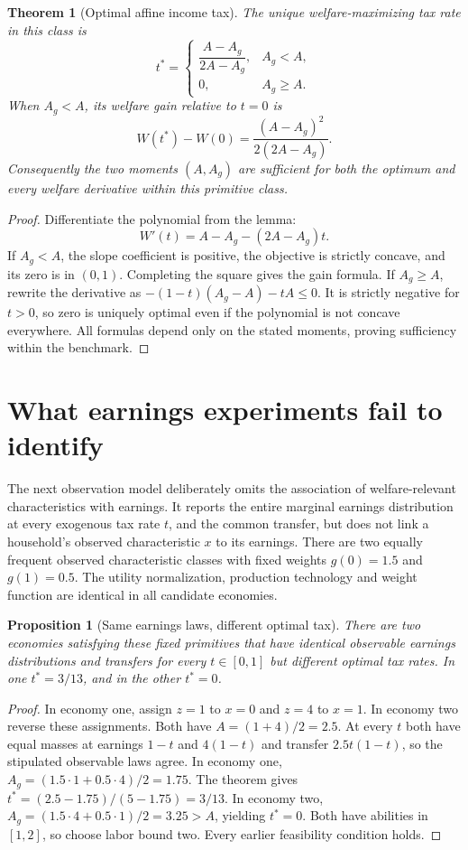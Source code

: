 \documentclass[11pt]{article}
\newtheorem{theorem}{Theorem}
\newtheorem{proposition}{Proposition}
\theoremstyle{definition}
\begin{document}
\begin{theorem}[Optimal affine income tax]
The unique welfare-maximizing tax rate in this class is
\[
 t^*=\begin{cases}
 \dfrac{A-A_g}{2A-A_g},& A_g<A,\\[6pt]
 0,& A_g\geq A.
 \end{cases}
\]
When $A_g<A$, its welfare gain relative to $t=0$ is
\[
 W(t^*)-W(0)=\frac{(A-A_g)^2}{2(2A-A_g)}.
\]
Consequently the two moments $(A,A_g)$ are sufficient for both the optimum and every welfare derivative within this primitive class.
\end{theorem}
\begin{proof}
Differentiate the polynomial from the lemma:
\[
 W'(t)=A-A_g-(2A-A_g)t.
\]
If $A_g<A$, the slope coefficient is positive, the objective is strictly concave, and its zero is in $(0,1)$. Completing the square gives the gain formula. If $A_g\geq A$, rewrite the derivative as $-(1-t)(A_g-A)-tA\leq0$. It is strictly negative for $t>0$, so zero is uniquely optimal even if the polynomial is not concave everywhere. All formulas depend only on the stated moments, proving sufficiency within the benchmark.
\end{proof}

\section*{What earnings experiments fail to identify}
The next observation model deliberately omits the association of welfare-relevant characteristics with earnings. It reports the entire marginal earnings distribution at every exogenous tax rate $t$, and the common transfer, but does not link a household's observed characteristic $x$ to its earnings. There are two equally frequent observed characteristic classes with fixed weights $g(0)=1.5$ and $g(1)=0.5$. The utility normalization, production technology and weight function are identical in all candidate economies.

\begin{proposition}[Same earnings laws, different optimal tax]
There are two economies satisfying these fixed primitives that have identical observable earnings distributions and transfers for every $t\in[0,1]$ but different optimal tax rates. In one $t^*=3/13$, and in the other $t^*=0$.
\end{proposition}
\begin{proof}
In economy one, assign $z=1$ to $x=0$ and $z=4$ to $x=1$. In economy two reverse these assignments. Both have $A=(1+4)/2=2.5$. At every $t$ both have equal masses at earnings $1-t$ and $4(1-t)$ and transfer $2.5t(1-t)$, so the stipulated observable laws agree. In economy one, $A_g=(1.5\cdot1+0.5\cdot4)/2=1.75$. The theorem gives $t^*=(2.5-1.75)/(5-1.75)=3/13$. In economy two, $A_g=(1.5\cdot4+0.5\cdot1)/2=3.25>A$, yielding $t^*=0$. Both have abilities in $[1,2]$, so choose labor bound two. Every earlier feasibility condition holds.
\end{proof}
\end{document}
